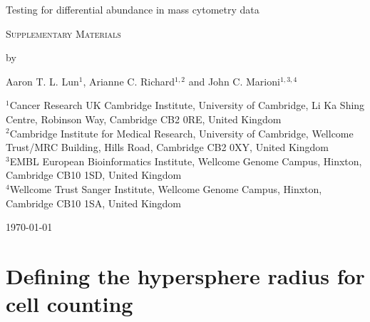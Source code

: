 \documentclass{article}
\begin{document}
\begin{titlepage}
\vspace*{3cm}
\begin{center}

{\LARGE
Testing for differential abundance in mass cytometry data
\par}

\vspace{0.75cm}

{\Large 
    \textsc{Supplementary Materials}
\par
}
\vspace{0.75cm}

\large
by

\vspace{0.75cm}
Aaron T. L. Lun$^{1}$, Arianne C. Richard$^{1,2}$ and John C. Marioni$^{1,3,4}$

\vspace{1cm}
\begin{minipage}{0.9\textwidth}
\begin{flushleft} 
$^1$Cancer Research UK Cambridge Institute, University of Cambridge, Li Ka Shing Centre, Robinson Way, Cambridge CB2 0RE, United Kingdom \\[6pt]
$^2$Cambridge Institute for Medical Research,  University of Cambridge, Wellcome Trust/MRC Building, Hills Road, Cambridge CB2 0XY, United Kingdom \\[6pt]
$^3$EMBL European Bioinformatics Institute, Wellcome Genome Campus, Hinxton, Cambridge CB10 1SD, United Kingdom \\[6pt]
$^4$Wellcome Trust Sanger Institute, Wellcome Genome Campus, Hinxton, Cambridge CB10 1SA, United Kingdom \\[6pt]
\end{flushleft}
\end{minipage}

\vspace{1.5cm}
{\large \today{}}

\vspace*{\fill}
\end{center}
\end{titlepage}

\section{Defining the hypersphere radius for cell counting}
\end{document}
